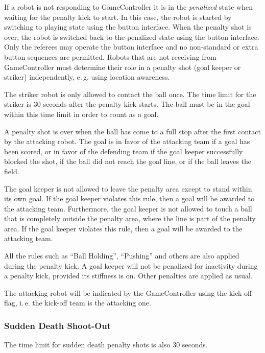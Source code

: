 \documentclass[12pt]{article}
\newcommand{\ie}{\mbox{i.\,e.}\xspace}
\newcommand{\eg}{\mbox{e.\,g.}\xspace}
\newcommand{\PenaltyKickTime}{30 seconds\xspace}
\begin{document}
If a robot is not responding to GameController it is in the \emph{penalized} state when waiting for the penalty kick to start. In this case, the robot is started by switching to playing state using the button interface. When the penalty shot is over, the robot is switched back to the penalized state using the button interface. Only the referees may operate the button interface and no non-standard or extra button sequences are permitted. Robots that are not receiving from GameController must determine their role in a penalty shot (goal keeper or striker) independently, \eg using location awareness.

The striker robot is only allowed to contact the ball once.  The time limit for the striker is \PenaltyKickTime after the penalty kick starts. The ball must be in the goal within this time limit in order to count as a goal.

A penalty shot is over when the ball has come to a full stop after the first contact by the attacking robot. The goal is in favor of the attacking team if a goal has been scored, or in favor of the defending team if the goal keeper successfully blocked the shot, if the ball did not reach the goal line, or if the ball leaves the field.

The goal keeper is not allowed to leave the penalty area except to stand within its own goal. If the goal keeper violates this rule, then a goal will be awarded to the attacking team. Furthermore, the goal keeper is not allowed to touch a ball that is completely outside the penalty area, where the line is part of the penalty area. If the goal keeper violates this rule, then a goal will be awarded to the attacking team.

All the rules such as ``Ball Holding'', ``Pushing'' and others are also applied during the penalty kick.  A goal keeper will not be penalized for inactivity during a penalty kick, provided its stiffness is on. Other penalties are applied as usual.

The attacking robot will be indicated by the GameController using the kick-off flag, \ie the kick-off team is the attacking one.

\subsubsection{Sudden Death Shoot-Out}
\label{sec:sudden_death_shoot_out}

The time limit for sudden death penalty shots is also \PenaltyKickTime.
\end{document}
